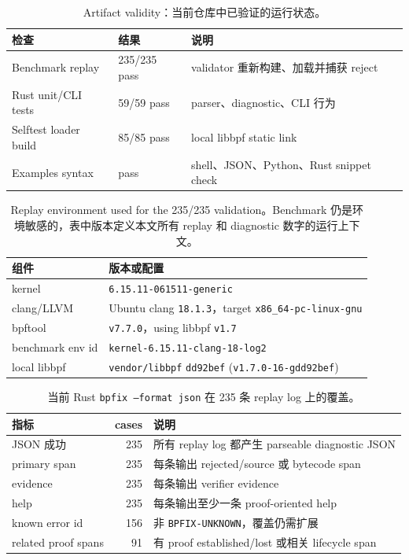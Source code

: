 \documentclass[letterpaper,twocolumn,10pt]{article}
\newcommand{\code}[1]{\texttt{#1}}
\begin{document}
\begin{table}[t]
\centering
\small
\caption{Artifact validity：当前仓库中已验证的运行状态。}
\label{tab:current-validation}
\begin{tabularx}{\columnwidth}{@{}l l X@{}}
\toprule
检查 & 结果 & 说明 \\
\midrule
Benchmark replay & 235/235 pass & validator 重新构建、加载并捕获 reject \\
Rust unit/CLI tests & 59/59 pass & parser、diagnostic、CLI 行为 \\
Selftest loader build & 85/85 pass & local libbpf static link \\
Examples syntax & pass & shell、JSON、Python、Rust snippet check \\
\bottomrule
\end{tabularx}
\end{table}

\begin{table}[t]
\centering
\small
\caption{Replay environment used for the 235/235 validation。Benchmark 仍是环境敏感的，表中版本定义本文所有 replay 和 diagnostic 数字的运行上下文。}
\label{tab:replay-env}
\begin{tabularx}{\columnwidth}{@{}l X@{}}
\toprule
组件 & 版本或配置 \\
\midrule
kernel & \code{6.15.11-061511-generic} \\
clang/LLVM & Ubuntu clang \code{18.1.3}，target \code{x86\_64-pc-linux-gnu} \\
bpftool & \code{v7.7.0}，using libbpf \code{v1.7} \\
benchmark env id & \code{kernel-6.15.11-clang-18-log2} \\
local libbpf & \code{vendor/libbpf} \code{dd92bef} (\code{v1.7.0-16-gdd92bef}) \\
\bottomrule
\end{tabularx}
\end{table}

\begin{table}[t]
\centering
\small
\caption{当前 Rust \code{bpfix --format json} 在 235 条 replay log 上的覆盖。}
\label{tab:rust-coverage}
\begin{tabularx}{\columnwidth}{@{}l r X@{}}
\toprule
指标 & cases & 说明 \\
\midrule
JSON 成功 & 235 & 所有 replay log 都产生 parseable diagnostic JSON \\
primary span & 235 & 每条输出 rejected/source 或 bytecode span \\
evidence & 235 & 每条输出 verifier evidence \\
help & 235 & 每条输出至少一条 proof-oriented help \\
known error id & 156 & 非 \code{BPFIX-UNKNOWN}，覆盖仍需扩展 \\
related proof spans & 91 & 有 proof established/lost 或相关 lifecycle span \\
\bottomrule
\end{tabularx}
\end{table}
\end{document}
